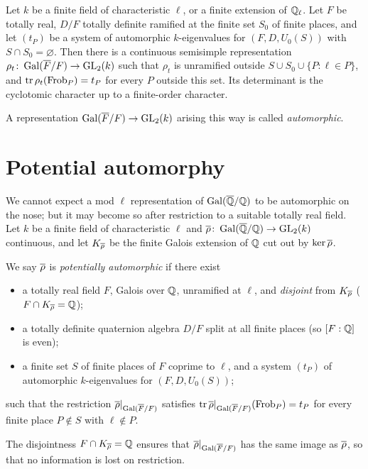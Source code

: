 \documentclass[11pt]{article}
\begin{document}
\begin{theorem}[Taylor, 1989]\label{thm:taylor}
Let $k$ be a finite field of characteristic $\ell$, or a finite extension of
$\mathbb{Q}_\ell$. Let $F$ be totally real, $D/F$ totally definite ramified at the finite
set $S_0$ of finite places, and let $(t_P)$ be a system of automorphic
$k$-eigenvalues for $(F,D,U_0(S))$ with $S\cap S_0=\varnothing$. Then there is a
continuous semisimple representation $\rho_t\colon\operatorname{Gal}(\overline{F}/F)\to\operatorname{GL}_2(k)$ such that
$\rho_t$ is unramified outside $S\cup S_0\cup\{P:\ell\in P\}$, and
$\operatorname{tr}\rho_t(\operatorname{Frob}_P)=t_P$ for every $P$ outside this set. Its determinant is the
cyclotomic character up to a finite-order character.
\end{theorem}

A representation $\operatorname{Gal}(\overline{F}/F)\to\operatorname{GL}_2(k)$ arising this way is called \emph{automorphic}.

\section{Potential automorphy}

We cannot expect a mod $\ell$ representation of $\operatorname{Gal}(\overline{\mathbb{Q}}/\mathbb{Q})$ to be automorphic on the
nose; but it may become so after restriction to a suitable totally real field.
Let $k$ be a finite field of characteristic $\ell$ and $\overline{\rho}\colon\operatorname{Gal}(\overline{\mathbb{Q}}/\mathbb{Q})\to\operatorname{GL}_2(k)$
continuous, and let $K_{\overline{\rho}}$ be the finite Galois extension of $\mathbb{Q}$ cut out
by $\ker\overline{\rho}$.

\begin{definition}\label{def:potaut}
We say $\overline{\rho}$ is \emph{potentially automorphic} if there exist
\begin{itemize}
\item a totally real field $F$, Galois over $\mathbb{Q}$, unramified at $\ell$, and
\emph{disjoint} from $K_{\overline{\rho}}$ \textup{(}$F\cap K_{\overline{\rho}}=\mathbb{Q}$\textup{)};
\item a totally definite quaternion algebra $D/F$ split at all finite places
\textup{(}so $[F:\mathbb{Q}]$ is even\textup{)};
\item a finite set $S$ of finite places of $F$ coprime to $\ell$, and a system
$(t_P)$ of automorphic $k$-eigenvalues for $(F,D,U_0(S))$;
\end{itemize}
such that the restriction $\overline{\rho}|_{\operatorname{Gal}(\overline{F}/F)}$ satisfies
$\operatorname{tr}\overline{\rho}|_{\operatorname{Gal}(\overline{F}/F)}(\operatorname{Frob}_P)=t_P$ for every finite place $P\notin S$ with
$\ell\notin P$.
\end{definition}

The disjointness $F\cap K_{\overline{\rho}}=\mathbb{Q}$ ensures that $\overline{\rho}|_{\operatorname{Gal}(\overline{F}/F)}$ has the
same image as $\overline{\rho}$, so that no information is lost on restriction.
\end{document}

